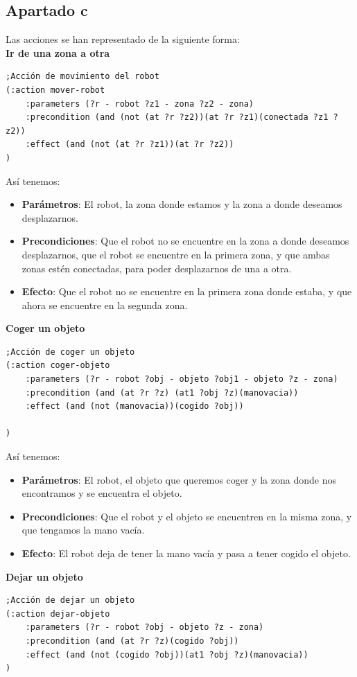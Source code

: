 \subsection{Apartado c}
Las acciones se han representado de la siguiente forma:\\
\textbf{Ir de una zona a otra}\\
\begin{verbatim}
;Acción de movimiento del robot
(:action mover-robot
    :parameters (?r - robot ?z1 - zona ?z2 - zona)
    :precondition (and (not (at ?r ?z2))(at ?r ?z1)(conectada ?z1 ?z2))
    :effect (and (not (at ?r ?z1))(at ?r ?z2))
)
\end{verbatim}
Así tenemos:
\begin{itemize}
	\item \textbf{Parámetros}: El robot, la zona donde estamos y la zona a donde deseamos desplazarnos.
	\item \textbf{Precondiciones}: Que el robot no se encuentre en la zona a donde deseamos desplazarnos, que el robot se encuentre en la primera zona, y que ambas zonas estén conectadas, para poder desplazarnos de una a otra.
	\item \textbf{Efecto}: Que el robot no se encuentre en la primera zona donde estaba, y que ahora se encuentre en la segunda zona.\\
\end{itemize}
\textbf{Coger un objeto}\\
\begin{verbatim}
;Acción de coger un objeto
(:action coger-objeto
    :parameters (?r - robot ?obj - objeto ?obj1 - objeto ?z - zona)
    :precondition (and (at ?r ?z) (at1 ?obj ?z)(manovacia))
    :effect (and (not (manovacia))(cogido ?obj))

)
\end{verbatim}
Así tenemos:
\begin{itemize}
	\item \textbf{Parámetros}: El robot, el objeto que queremos coger y la zona donde nos encontramos y se encuentra el objeto.
	\item \textbf{Precondiciones}: Que el robot y el objeto se encuentren en la misma zona, y que tengamos la mano vacía.
	\item \textbf{Efecto}: El robot deja de tener la mano vacía y pasa a tener cogido el objeto.\\
\end{itemize}
\textbf{Dejar un objeto}\\
\begin{verbatim}
;Acción de dejar un objeto
(:action dejar-objeto
    :parameters (?r - robot ?obj - objeto ?z - zona)
    :precondition (and (at ?r ?z)(cogido ?obj))
    :effect (and (not (cogido ?obj))(at1 ?obj ?z)(manovacia))
)
\end{verbatim}
